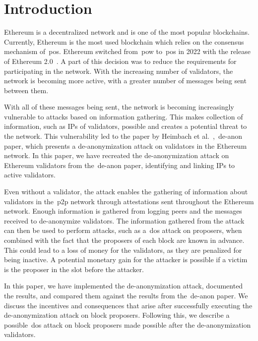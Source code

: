 

\section{Introduction}\label{sec:introduction}
Ethereum is a decentralized network and is one of the most popular blockchains.
Currently, Ethereum is the most used blockchain which relies on the consensus mechanism of~\gls{pos}.
Ethereum switched from~\gls{pow} to~\gls{pos} in 2022 with the release of Ethereum 2.0~\cite{EthereumProof-of-stakePoS}.
A part of this decision was to reduce the requirements for participating in the network.
With the increasing number of validators, the network is becoming more active, with a greater number of messages being sent between them.


With all of these messages being sent, the network is becoming increasingly vulnerable to attacks based on information gathering.
This makes collection of information, such as IPs of validators, possible and creates a potential threat to the network.
This vulnerability led to the paper by Heimbach et al.~\cite{heimbach2024deanonymizingethereumvalidatorsp2p},~\gls{de-anon paper}, which presents a de-anonymization attack on validators in the Ethereum network.
In this paper, we have recreated the de-anonymization attack on Ethereum validators from the~\gls{de-anon paper}, identifying and linking IPs to active validators.


Even without a validator, the attack enables the gathering of information about validators in the~\gls{p2p} network through attestations sent throughout the Ethereum network.
Enough information is gathered from logging peers and the messages received to de-anonymize validators.
The information gathered from the attack can then be used to perform attacks, such as a~\gls{dos} attack on proposers, when combined with the fact that the proposers of each block are known in advance.
This could lead to a loss of money for the validators, as they are penalized for being inactive.
A potential monetary gain for the attacker is possible if a victim is the proposer in the slot before the attacker.

In this paper, we have implemented the de-anonymization attack, documented the results, and compared them against
the results from the~\gls{de-anon paper}.
We discuss the incentives and consequences that arise after successfully executing the de-anonymization attack on block proposers.
Following this, we describe a possible~\gls{dos} attack on block proposers made possible after the de-anonymization validators.


